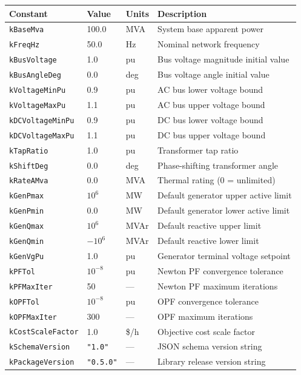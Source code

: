 \begin{longtable}{llll}
\hline\hline
\textbf{Constant} & \textbf{Value} & \textbf{Units} & \textbf{Description} \\
\hline\endhead\hline\endfoot
\texttt{kBaseMva} & 100.0 & MVA & System base apparent power \\
\texttt{kFreqHz} & 50.0 & Hz & Nominal network frequency \\
\texttt{kBusVoltage} & 1.0 & pu & Bus voltage magnitude initial value \\
\texttt{kBusAngleDeg} & 0.0 & deg & Bus voltage angle initial value \\
\texttt{kVoltageMinPu} & 0.9 & pu & AC bus lower voltage bound \\
\texttt{kVoltageMaxPu} & 1.1 & pu & AC bus upper voltage bound \\
\texttt{kDCVoltageMinPu} & 0.9 & pu & DC bus lower voltage bound \\
\texttt{kDCVoltageMaxPu} & 1.1 & pu & DC bus upper voltage bound \\
\texttt{kTapRatio} & 1.0 & pu & Transformer tap ratio \\
\texttt{kShiftDeg} & 0.0 & deg & Phase-shifting transformer angle \\
\texttt{kRateAMva} & 0.0 & MVA & Thermal rating (0 = unlimited) \\
\texttt{kGenPmax} & \(10^6\) & MW & Default generator upper active limit \\
\texttt{kGenPmin} & 0.0 & MW & Default generator lower active limit \\
\texttt{kGenQmax} & \(10^6\) & MVAr & Default reactive upper limit \\
\texttt{kGenQmin} & \(-10^6\) & MVAr & Default reactive lower limit \\
\texttt{kGenVgPu} & 1.0 & pu & Generator terminal voltage setpoint \\
\texttt{kPFTol} & \(10^{-8}\) & pu & Newton PF convergence tolerance \\
\texttt{kPFMaxIter} & 50 & --- & Newton PF maximum iterations \\
\texttt{kOPFTol} & \(10^{-8}\) & pu & OPF convergence tolerance \\
\texttt{kOPFMaxIter} & 300 & --- & OPF maximum iterations \\
\texttt{kCostScaleFactor} & 1.0 & \$/h & Objective cost scale factor \\
\texttt{kSchemaVersion} & \texttt{"1.0"} & --- & JSON schema version string \\
\texttt{kPackageVersion} & \texttt{"0.5.0"} & --- & Library release version string \\
\end{longtable}

